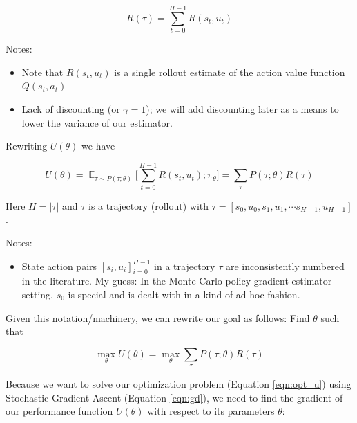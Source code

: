 \documentclass[11pt, oneside]{article}   	%
\DeclareMathOperator{\E}{\mathbb{E}}
\begin{document}
\bigskip
\begin{equation*}
R(\tau) = \sum\limits_{t = 0}^{H - 1} R(s_t,u_t)
\end{equation*}

\noindent
Notes:
\begin{itemize}
\item Note that $R(s_t,u_t)$ is a single rollout estimate of the action value function $Q(s_t,a_t)$
\item Lack of discounting (or $\gamma = 1$); we will add discounting later as a means to lower the variance of our estimator.
\end{itemize}

\bigskip
\noindent
Rewriting $U(\theta)$ we have

\bigskip
\begin{equation}
\label{eqn:u}
U(\theta) = \E_{\tau \sim P(\tau;\theta)} \Bigg [\sum\limits_{t = 0}^{H - 1} R(s_t,u_t) ; \pi_\theta \Bigg ] = \sum\limits_{\tau}P(\tau; \theta)R(\tau)
\end{equation}

\bigskip
\noindent
Here $H = |\tau |$ and $\tau$ is a trajectory (rollout) with $\tau = [s_0,u_0, s_1,u_1, \cdots s_{H-1},u_{H-1}]$.  

\bigskip
\noindent
Notes:
\begin{itemize}
\item State action pairs $[s_i,u_i]^{H-1}_{i = 0}$ in a trajectory $\tau$ are inconsistently numbered in the literature.  My guess:  In 
the Monte Carlo policy gradient estimator setting, $s_0$ is special and is dealt with in a kind of ad-hoc fashion.
\end{itemize}

\bigskip
\noindent
Given this notation/machinery, we can rewrite our goal as follows: Find $\theta$ such that 

\bigskip
\begin{equation}
\label{eqn:opt_u}
\max\limits_{\theta} U(\theta) = \max\limits_{\theta} \sum\limits_{\tau}P(\tau; \theta) R(\tau)
\end{equation}

\bigskip
\noindent
Because we want to solve our optimization problem (Equation \ref{eqn:opt_u}) using Stochastic Gradient Ascent (Equation \ref{eqn:gd}), 
we need to find the gradient of our performance function $U(\theta)$ with respect to its parameters $\theta$:
\end{document}
